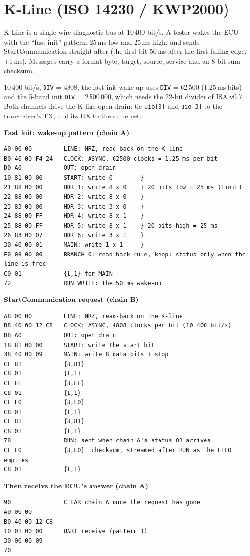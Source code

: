 \documentclass[11pt,a4paper]{article}
\newcommand{\sig}[1]{\texttt{#1}}
\newcommand{\progtitle}[1]{\par\smallskip\textbf{\small\color{accent}#1}\par\nopagebreak}
\newcommand{\facts}[1]{\par\noindent\colorbox{codebg}{\parbox{\dimexpr\linewidth-2\fboxsep}{\small #1}}\par}
\begin{document}
\section{K-Line (ISO 14230 / KWP2000)}
K-Line is a single-wire diagnostic bus at 10\,400 bit/s. A tester wakes the ECU with the ``fast init'' pattern, 25\,ms low and 25\,ms high, and sends StartCommunication straight after (the first bit 50\,ms after the first falling edge, $\pm$1\,ms). Messages carry a format byte, target, source, service and an 8-bit sum checksum.
\facts{10\,400 bit/s, \sig{DIV} = 4808; the fast-init wake-up uses \sig{DIV} = 62\,500 (1.25\,ms bits) and the 5-baud init \sig{DIV} = 2\,500\,000, which needs the 22-bit divider of ISA v0.7. Both channels drive the K-line open drain: tie \sig{uio[0]} and \sig{uio[3]} to the transceiver's TX, and its RX to the same net.}
\progtitle{Fast init: wake-up pattern (chain A)}
\begin{lstlisting}
A0 00 00         LINE: NRZ, read-back on the K-line
B0 40 00 F4 24   CLOCK: ASYNC, 62500 clocks = 1.25 ms per bit
D0 A0            OUT: open drain
10 81 00 00      START: write 0        }
21 88 00 00      HDR 1: write 8 x 0    } 20 bits low = 25 ms (TiniL)
22 88 00 00      HDR 2: write 8 x 0    }
23 83 00 00      HDR 3: write 3 x 0    }
24 88 00 FF      HDR 4: write 8 x 1    }
25 88 00 FF      HDR 5: write 8 x 1    } 20 bits high = 25 ms
26 83 00 07      HDR 6: write 3 x 1    }
30 40 00 01      MAIN: write 1 x 1     }
F0 08 00 00      BRANCH 0: read-back rule, keep: status only when the line is free
C0 01            {1,1} for MAIN
72               RUN WRITE: the 50 ms wake-up
\end{lstlisting}
\progtitle{StartCommunication request (chain B)}
\begin{lstlisting}
A8 00 00         LINE: NRZ, read-back on the K-line
B8 40 00 12 C8   CLOCK: ASYNC, 4808 clocks per bit (10 400 bit/s)
D8 A0            OUT: open drain
18 81 00 00      START: write the start bit
38 40 00 09      MAIN: write 8 data bits + stop
CF 81            {8,81}
C8 01            {1,1}
CF EE            {8,EE}
C8 01            {1,1}
CF F0            {8,F0}
C8 01            {1,1}
CF 81            {8,81}
C8 01            {1,1}
78               RUN: sent when chain A's status 01 arrives
CF E0            {8,E0}  checksum, streamed after RUN as the FIFO empties
C8 01            {1,1}
\end{lstlisting}
\progtitle{Then receive the ECU's answer (chain A)}
\begin{lstlisting}
90               CLEAR chain A once the request has gone
A0 00 00         
B0 40 00 12 C8   
10 01 00 00      UART receive (pattern 1)
30 00 00 09      
70               
\end{lstlisting}
\end{document}
